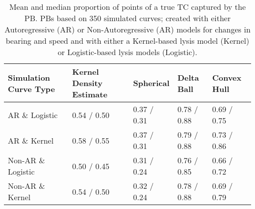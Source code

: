 \begin{table}[ht!]
\centering
\begin{tabular}{|R{1.2in}||L{.95in}L{.8in}|L{.75in}L{.75in}|}
  \hline
Simulation Curve Type & Kernel Density Estimate & Spherical & Delta Ball & Convex Hull \\ 
  \hline
AR \& Logistic & 0.54 / 0.50 & 0.37 / 0.31 & 0.78 / 0.88 & 0.69 / 0.75 \\ 
  AR \& Kernel & 0.58 / 0.55 & 0.37 / 0.31 & 0.79 / 0.88 & 0.73 / 0.86 \\ 
  Non-AR \& Logistic & 0.50 / 0.45 & 0.31 / 0.24 & 0.76 / 0.85 & 0.66 / 0.72 \\ 
  Non-AR \& Kernel & 0.54 / 0.50 & 0.32 / 0.24 & 0.78 / 0.88 & 0.69 / 0.79 \\ 
   \hline
\end{tabular}
\caption{Mean and median proportion of points of a true TC captured by the PB. PBs based on 350 simulated curves; created with either Autoregressive (AR) or Non-Autoregressive (AR) models for changes in bearing and speed and with either a Kernel-based lysis model (Kernel) or Logistic-based lysis models (Logistic).} 
\label{tab:average_captured}
\end{table}
